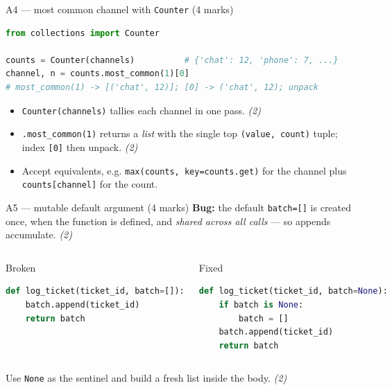 \documentclass[aspectratio=169,11pt]{beamer}
\begin{document}
\begin{frame}[fragile]{A4 --- most common channel with \texttt{Counter} (4 marks)}
\begin{lstlisting}[language=Python]
from collections import Counter

counts = Counter(channels)          # {'chat': 12, 'phone': 7, ...}
channel, n = counts.most_common(1)[0]
# most_common(1) -> [('chat', 12)]; [0] -> ('chat', 12); unpack
\end{lstlisting}
\begin{itemize}
  \item \texttt{Counter(channels)} tallies each channel in one pass. \hfill \emph{(2)}
  \item \texttt{.most\_common(1)} returns a \emph{list} with the single top
        \texttt{(value, count)} tuple; index \texttt{[0]} then unpack. \hfill \emph{(2)}
  \item \textcolor{cgreen}{Accept} equivalents, e.g. \texttt{max(counts, key=counts.get)} for the
        channel plus \texttt{counts[channel]} for the count.
\end{itemize}
\end{frame}

\begin{frame}[fragile]{A5 --- mutable default argument (4 marks)}
\textbf{Bug:} the default \texttt{batch=[]} is created \textcolor{cred}{once, when the function is
defined}, and \emph{shared across all calls} --- so appends accumulate. \hfill \emph{(2)}
\begin{columns}[T]
\begin{block}{Broken}
\begin{lstlisting}[language=Python]
def log_ticket(ticket_id, batch=[]):
    batch.append(ticket_id)
    return batch
\end{lstlisting}
\end{block}
\begin{block}{Fixed}
\begin{lstlisting}[language=Python]
def log_ticket(ticket_id, batch=None):
    if batch is None:
        batch = []
    batch.append(ticket_id)
    return batch
\end{lstlisting}
\end{block}
\end{columns}
\vspace{0.4em}
Use \texttt{None} as the sentinel and build a fresh list inside the body. \hfill \emph{(2)}
\end{frame}
\end{document}

